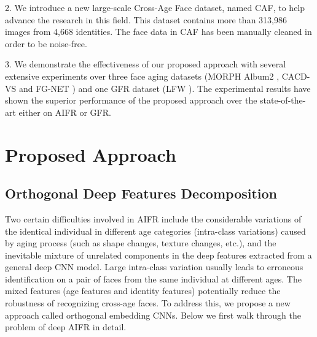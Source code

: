 \documentclass[runningheads]{llncs}
\begin{document}
2. We introduce a new large-scale Cross-Age Face dataset, named CAF, to help advance the research in this field. This dataset contains more than 313,986 images from 4,668 identities. The face data in CAF has been manually cleaned in order to be noise-free.


3. We demonstrate the effectiveness of our proposed approach with several extensive experiments over three face aging datasets (MORPH Album2 \cite{morph}, CACD-VS \cite{cacd} and FG-NET \cite{fgnet}) and one GFR dataset (LFW \cite{lfw}). The experimental results have shown the superior performance of the proposed approach over the state-of-the-art either on AIFR or GFR.

\section{Proposed Approach}

\subsection{Orthogonal Deep Features Decomposition}


Two certain difficulties involved in AIFR include the considerable variations of the identical individual in different age categories (intra-class variations) caused by aging process (such as shape changes, texture changes, etc.), and the inevitable mixture of unrelated components in the deep features extracted from a general deep CNN model. Large intra-class variation usually leads to erroneous identification on a pair of faces from the same individual at different ages. The mixed features (age features and identity features) potentially reduce the robustness of recognizing cross-age faces. To address this, we propose a new approach called orthogonal embedding CNNs. Below we first walk through the problem of deep AIFR in detail. 
\end{document}
